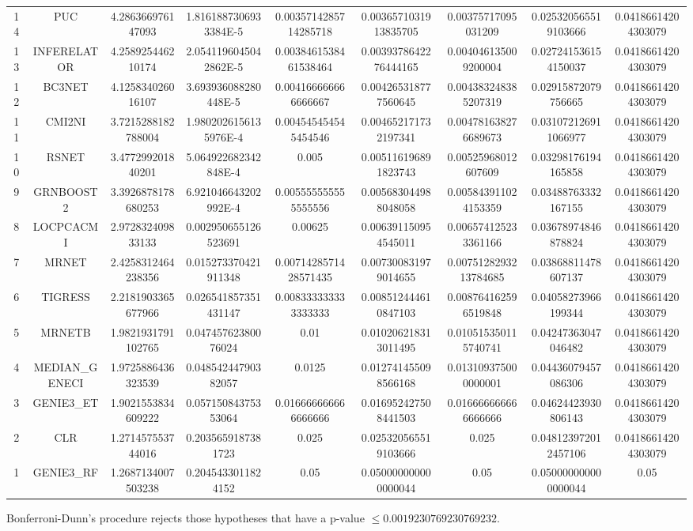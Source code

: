 \documentclass[a4paper,10pt]{article}
\begin{document}
\begin{landscape}
\begin{table}[!htp]
\begin{tabular}{ccccccccc}
14&PUC&4.286366976147093&1.8161887306933384E-5&0.0035714285714285718&0.0036571031913835705&0.00375717095031209&0.025320565519103666&0.04186614204303079\\
13&INFERELATOR&4.258925446210174&2.0541196045042862E-5&0.0038461538461538464&0.0039378642276444165&0.004046135009200004&0.027241536154150037&0.04186614204303079\\
12&BC3NET&4.125834026016107&3.693936088280448E-5&0.004166666666666667&0.004265318777560645&0.004383248385207319&0.02915872079756665&0.04186614204303079\\
11&CMI2NI&3.7215288182788004&1.9802026156135976E-4&0.004545454545454546&0.004652171732197341&0.004781638276689673&0.031072126911066977&0.04186614204303079\\
10&RSNET&3.477299201840201&5.064922682342848E-4&0.005&0.005116196891823743&0.00525968012607609&0.03298176194165858&0.04186614204303079\\
9&GRNBOOST2&3.3926878178680253&6.921046643202992E-4&0.005555555555555556&0.005683044988048058&0.005843911024153359&0.03488763332167155&0.04186614204303079\\
8&LOCPCACMI&2.972832409833133&0.002950655126523691&0.00625&0.006391150954545011&0.006574125233361166&0.03678974846878824&0.04186614204303079\\
7&MRNET&2.4258312464238356&0.015273370421911348&0.0071428571428571435&0.007300831979014655&0.0075128293213784685&0.03868811478607137&0.04186614204303079\\
6&TIGRESS&2.2181903365677966&0.026541857351431147&0.008333333333333333&0.008512444610847103&0.008764162596519848&0.04058273966199344&0.04186614204303079\\
5&MRNETB&1.9821931791102765&0.04745762380076024&0.01&0.010206218313011495&0.010515350115740741&0.04247363047046482&0.04186614204303079\\
4&MEDIAN_GENECI&1.9725886436323539&0.04854244790382057&0.0125&0.012741455098566168&0.013109375000000001&0.04436079457086306&0.04186614204303079\\
3&GENIE3_ET&1.9021553834609222&0.05715084375353064&0.016666666666666666&0.016952427508441503&0.016666666666666666&0.04624423930806143&0.04186614204303079\\
2&CLR&1.271457553744016&0.2035659187381723&0.025&0.025320565519103666&0.025&0.048123972012457106&0.04186614204303079\\
1&GENIE3_RF&1.2687134007503238&0.2045433011824152&0.05&0.050000000000000044&0.05&0.050000000000000044&0.05\\
\hline
\end{tabular}
\end{table}
Bonferroni-Dunn's procedure rejects those hypotheses that have a p-value $\le0.0019230769230769232$.



\end{landscape}
\end{document}
